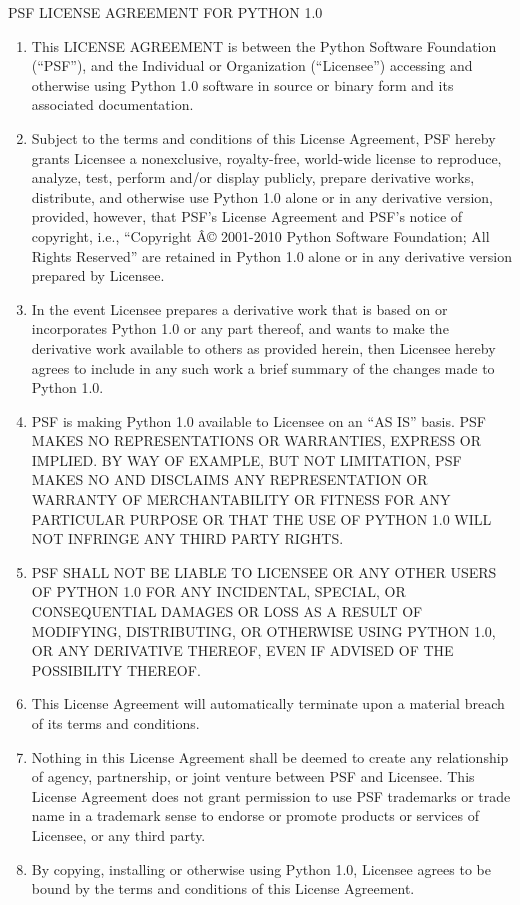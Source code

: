 \documentclass[letterpaper,10pt,english]{manual}
\begin{document}
\begin{center}PSF LICENSE AGREEMENT FOR PYTHON 1.0
\end{center}\begin{enumerate}
\item {} 
This LICENSE AGREEMENT is between the Python Software Foundation (``PSF''), and
the Individual or Organization (``Licensee'') accessing and otherwise using Python
1.0 software in source or binary form and its associated documentation.

\item {} 
Subject to the terms and conditions of this License Agreement, PSF hereby
grants Licensee a nonexclusive, royalty-free, world-wide license to reproduce,
analyze, test, perform and/or display publicly, prepare derivative works,
distribute, and otherwise use Python 1.0 alone or in any derivative
version, provided, however, that PSF's License Agreement and PSF's notice of
copyright, i.e., ``Copyright Â© 2001-2010 Python Software Foundation; All Rights
Reserved'' are retained in Python 1.0 alone or in any derivative version
prepared by Licensee.

\item {} 
In the event Licensee prepares a derivative work that is based on or
incorporates Python 1.0 or any part thereof, and wants to make the
derivative work available to others as provided herein, then Licensee hereby
agrees to include in any such work a brief summary of the changes made to Python
1.0.

\item {} 
PSF is making Python 1.0 available to Licensee on an ``AS IS'' basis.
PSF MAKES NO REPRESENTATIONS OR WARRANTIES, EXPRESS OR IMPLIED.  BY WAY OF
EXAMPLE, BUT NOT LIMITATION, PSF MAKES NO AND DISCLAIMS ANY REPRESENTATION OR
WARRANTY OF MERCHANTABILITY OR FITNESS FOR ANY PARTICULAR PURPOSE OR THAT THE
USE OF PYTHON 1.0 WILL NOT INFRINGE ANY THIRD PARTY RIGHTS.

\item {} 
PSF SHALL NOT BE LIABLE TO LICENSEE OR ANY OTHER USERS OF PYTHON 1.0
FOR ANY INCIDENTAL, SPECIAL, OR CONSEQUENTIAL DAMAGES OR LOSS AS A RESULT OF
MODIFYING, DISTRIBUTING, OR OTHERWISE USING PYTHON 1.0, OR ANY DERIVATIVE
THEREOF, EVEN IF ADVISED OF THE POSSIBILITY THEREOF.

\item {} 
This License Agreement will automatically terminate upon a material breach of
its terms and conditions.

\item {} 
Nothing in this License Agreement shall be deemed to create any relationship
of agency, partnership, or joint venture between PSF and Licensee.  This License
Agreement does not grant permission to use PSF trademarks or trade name in a
trademark sense to endorse or promote products or services of Licensee, or any
third party.

\item {} 
By copying, installing or otherwise using Python 1.0, Licensee agrees
to be bound by the terms and conditions of this License Agreement.

\end{enumerate}
\end{document}
